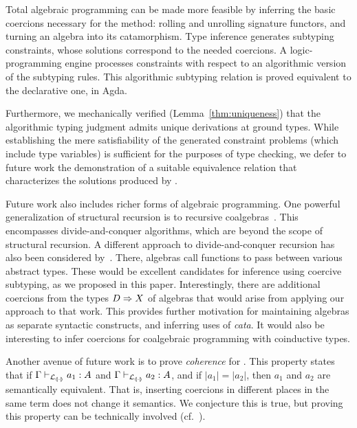 \documentclass[pdflatex,sn-mathphys-num]{sn-jnl}%
\theoremstyle{thmstyleone}%
\theoremstyle{thmstyletwo}%
\theoremstyle{thmstylethree}%
\begin{document}
Total algebraic programming can be made more feasible by inferring the
basic coercions necessary for the method: rolling and unrolling
signature functors, and turning an algebra into its catamorphism.
Type inference generates subtyping constraints, whose solutions
correspond to the needed coercions.  A logic-programming engine
processes constraints with respect to an algorithmic version of the
subtyping rules.  This algorithmic subtyping relation is proved
equivalent to the declarative one, in Agda.

Furthermore, we mechanically verified (Lemma~\ref{thm:uniqueness}) that the
algorithmic typing judgment admits unique derivations at ground types. While
establishing the mere satisfiability of the generated constraint problems (which
include type variables) is sufficient for the purposes of type checking, we
defer to future work the demonstration of a suitable equivalence relation that
characterizes the solutions produced by .

Future work also includes richer forms of algebraic programming.  One
powerful generalization of structural recursion is to recursive
coalgebras~\cite{capretta+06}.  This encompasses divide-and-conquer
algorithms, which are beyond the scope of structural recursion.  A
different approach to divide-and-conquer recursion has also been
considered by~\citet{abreu+23}.  There, algebras call functions to
pass between various abstract types.  These would be excellent
candidates for inference using coercive subtyping, as we proposed in
this paper.  Interestingly, there are additional coercions from the
types $D \Rightarrow X$ of algebras that would arise from applying our
approach to that work.  This provides further motivation for
maintaining algebras as separate syntactic constructs, and inferring
uses of \textit{cata}.  It would also be interesting to infer
coercions for coalgebraic programming with coinductive types.

Another avenue of future work is to prove \emph{coherence} for \lcata.
This property states that if $\Gamma \vdash_{\mathcal{L}_{{\llparenthesis \cdot \rrparenthesis}}} a_1 : A$ and
$\Gamma \vdash_{\mathcal{L}_{{\llparenthesis \cdot \rrparenthesis}}} a_2 : A$, and if $|a_1| = |a_2|$, then $a_1$
and $a_2$ are semantically equivalent.  That is, inserting coercions
in different places in the same term does not change it semantics.  We
conjecture this is true, but proving this property can be technically
involved (cf.~\cite{biernacki18}).

\appendix

\end{document}
